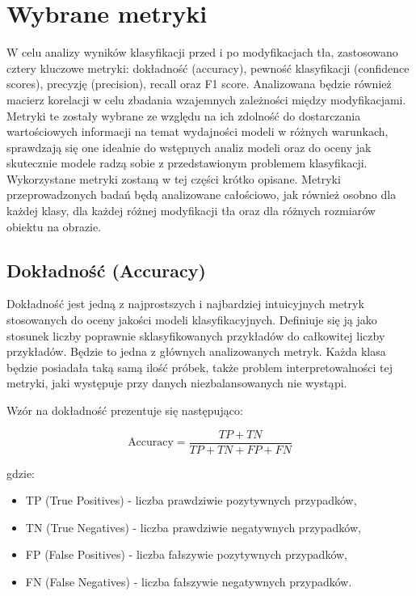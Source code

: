 \section*{Wybrane metryki}

W celu analizy wyników klasyfikacji przed i po modyfikacjach tła, zastosowano cztery kluczowe metryki: dokładność (accuracy), pewność klasyfikacji (confidence scores), precyzję (precision), recall oraz F1 score. Analizowana będzie również 
macierz korelacji w celu zbadania wzajemnych zależności między modyfikacjami. Metryki te zostały wybrane ze względu na ich zdolność do dostarczania wartościowych informacji na temat wydajności modeli w różnych warunkach, sprawdzają się
one idealnie do wstępnych analiz modeli oraz do oceny jak skutecznie modele radzą sobie z przedstawionym problemem klasyfikacji. Wykorzystane metryki zostaną w tej części krótko opisane. Metryki przeprowadzonych badań będą analizowane 
całościowo, jak również osobno dla każdej klasy, dla każdej różnej modyfikacji tła oraz dla różnych rozmiarów obiektu na obrazie.


\subsection*{Dokładność (Accuracy)}

Dokładność jest jedną z najprostszych i najbardziej intuicyjnych metryk stosowanych do oceny jakości modeli klasyfikacyjnych. Definiuje się ją jako stosunek liczby poprawnie sklasyfikowanych przykładów do całkowitej liczby 
przykładów. Będzie to jedna z głównych analizowanych metryk. Każda klasa będzie posiadała taką samą ilość próbek, także problem interpretowalności tej metryki, jaki występuje przy danych niezbalansowanych nie wystąpi.

Wzór na dokładność prezentuje się następująco:

\begin{equation}
\text{Accuracy} = \frac{TP + TN}{TP + TN + FP + FN}
\end{equation}

gdzie:
\begin{itemize}
    \item TP (True Positives) - liczba prawdziwie pozytywnych przypadków,
    \item TN (True Negatives) - liczba prawdziwie negatywnych przypadków,
    \item FP (False Positives) - liczba fałszywie pozytywnych przypadków,
    \item FN (False Negatives) - liczba fałszywie negatywnych przypadków.
\end{itemize}

